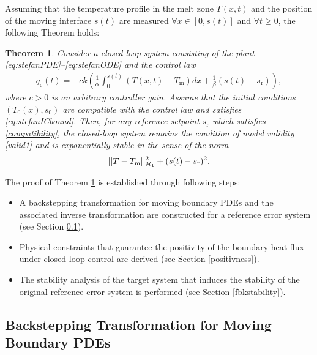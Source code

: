 \documentclass[journal]{IEEEtran}
\newtheorem{thm}{Theorem}
\begin{document}
Assuming that the temperature profile in the melt zone $T(x,t)$ and the position of the moving interface $s(t)$ are measured  $\forall x\in [0, s(t)]$ and $\forall t\geq 0$, the following Theorem holds:  
\begin{thm}\label{Theo-1}
Consider a closed-loop system consisting of the plant \eqref{eq:stefanPDE}--\eqref{eq:stefanODE} and the control law
\begin{align}\label{Fullcontrol}
q_{{\mathrm c}}(t)=-ck \left(\frac{1}{\alpha}\int_0^{s(t)} (T(x,t)-T_{{\mathrm m}}) dx +\frac{1 }{\beta}(s(t)-s_{{\mathrm r}})\right), 
\end{align}
where $c>0$ is an arbitrary controller gain. Assume that the initial conditions $(T_0(x), s_0)$ are compatible with the control law and satisfies \eqref{eq:stefanICbound}. Then, for any reference setpoint $s_{{\mathrm r}}$ which satisfies \eqref{compatibility}, the closed-loop system remains the condition of model validity \eqref{valid1} and is exponentially stable in the sense of the norm
\begin{align}\label{H1norm}
||T-T_{{\mathrm m}}||_{{\cal H}_1}^2+(s(t)-s_{{\mathrm r}})^2.
\end{align}
\end{thm}
The proof of Theorem \ref{Theo-1} is established through following steps:
\begin{itemize}
\item A backstepping transformation for moving boundary PDEs and the associated inverse transformation  are constructed for a reference error system  (see Section \ref{fbktarget}).
\item Physical constraints that guarantee the positivity of the boundary heat flux under closed-loop control  are derived (see Section \ref{positivness}).
\item The stability analysis of the target system that induces the stability of the original reference error system is performed (see Section \ref{fbkstability}).
\end{itemize}
\subsection{Backstepping Transformation for Moving Boundary PDEs}\label{fbktarget}
\end{document}
